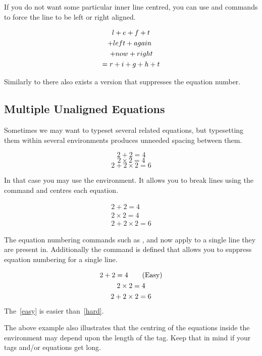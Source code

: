 If you do not want some particular inner line centred, you can use
 and  commands to force the line to be left or
right aligned.
\begin{example}
\begin{multline}
  l + e + f + t \\
  \shoveleft{+ left + again} \\
  \shoveright{+ now + right} \\
  = r + i + g + h + t
\end{multline}
\end{example}

Similarly to  there also exists a  version that
suppresses the equation number.

\subsection{Multiple Unaligned Equations}

Sometimes we may want to typeset several related equations, but typesetting
them within several  environments produces unneeded spacing
between them.
\begin{example}
\begin{equation}
  2 + 2 = 4
\end{equation}
\begin{equation}
  2 \times 2 = 4
\end{equation}
\begin{equation}
  2 + 2 \times 2 = 6
\end{equation}
\end{example}
In that case you may use the  environment. It allows you to break
lines using the \csi{\bs} command and centres each equation.
\begin{example}
\begin{gather}
  2 + 2 = 4 \\
  2 \times 2 = 4 \\
  2 + 2 \times 2 = 6
\end{gather}
\end{example}
The equation numbering commands such as ,  and 
now apply to a single line they are present in. Additionally the command
 is defined that allows you to suppress equation numbering for a
single line.
\begin{example}
\begin{gather}
  2 + 2 = 4
    \tag{Easy}\label{easy} \\
  2 \times 2 = 4 \notag \\
  2 + 2 \times 2 = 6
    \label{hard}
\end{gather}
The~\eqref{easy} is easier
than~\eqref{hard}.
\end{example}
The above example also illustrates that the centring of the equations inside
the environment may depend upon the length of the tag. Keep that in mind if
your tags and/or equations get long.

